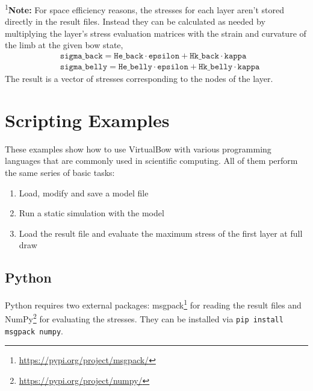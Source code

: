 \documentclass[12pt]{article}
\begin{document}
\textsuperscript{1}\textbf{Note:} For space efficiency reasons, the stresses for each layer aren't stored directly in the result files.
Instead they can be calculated as needed by multiplying the layer's stress evaluation matrices with the strain and curvature of the limb at the given bow state,
%
\begin{align*}
&\mathrm{\texttt{sigma\_back}} = \mathrm{\texttt{He\_back}} \cdot \mathrm{\texttt{epsilon}} + \mathrm{\texttt{Hk\_back}} \cdot \mathrm{\texttt{kappa}}\\
&\mathrm{\texttt{sigma\_belly}} = \mathrm{\texttt{He\_belly}} \cdot \mathrm{\texttt{epsilon}} + \mathrm{\texttt{Hk\_belly}} \cdot \mathrm{\texttt{kappa}}
\end{align*}
%
The result is a vector of stresses corresponding to the nodes of the layer.


\newpage
\section{Scripting Examples}
\label{sec:scripting-examples}

These examples show how to use VirtualBow with various programming languages that are commonly used in scientific computing.
All of them perform the same series of basic tasks:

\begin{enumerate}
\item Load, modify and save a model file
\item Run a static simulation with the model
\item Load the result file and evaluate the maximum stress of the first layer at full draw
\end{enumerate}

\subsection{Python}

Python requires two external packages: msgpack\footnote{\url{https://pypi.org/project/msgpack/}} for reading the result files and NumPy\footnote{\url{https://pypi.org/project/numpy/}} for evaluating the stresses. They can be installed via \texttt{pip install msgpack numpy}.
\end{document}

